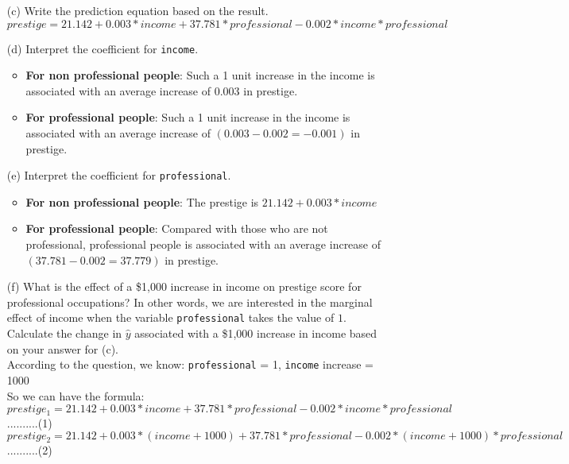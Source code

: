 \documentclass[12pt,letterpaper]{article}
\begin{document}
\begin{enumerate}
	\vspace{.5cm}

	\item [(c)]
	Write the prediction equation based on the result.\\
	
	$prestige = 21.142 + 0.003 * income + 37.781 * professional - 0.002 * income * professional$
	
	\vspace{.5cm}
	\item [(d)]
	Interpret the coefficient for \texttt{income}.
	\begin{itemize}
		\item \textbf{For non professional people}: Such a 1 unit increase in the income is associated with an average increase of 0.003 in prestige.
		\item \textbf{For professional people}: Such a 1 unit increase in the income is associated with an average increase of $(0.003 - 0.002 = -0.001)$ in prestige.
	\end{itemize}
	\vspace{.5cm}
	\item [(e)]
	Interpret the coefficient for \texttt{professional}.
	\begin{itemize}
		\item  \textbf{For non professional people}: The prestige is $21.142 + 0.003 * income$
		\item \textbf{For professional people}: Compared with those who are not professional, professional people is associated with an average increase of $(37.781 - 0.002 = 37.779)$ in prestige.
	\end{itemize}
	\newpage
	\item [(f)]
	What is the effect of a \$1,000 increase in income on prestige score for professional occupations? In other words, we are interested in the marginal effect of income when the variable \texttt{professional} takes the value of $1$. Calculate the change in $\hat{y}$ associated with a \$1,000 increase in income based on your answer for (c).\\

	According to the question, we know: \texttt{professional} = 1,  \texttt{income} increase = 1000\\
	So we can have the formula: \\
	$prestige_1 =  21.142 + 0.003 * income + 37.781 * professional - 0.002 * income * professional $  ..........(1)\\
	$prestige_2 =  21.142 + 0.003 * (income + 1000) + 37.781 * professional - 0.002 * (income + 1000) * professional $ ..........(2) \\
	

\end{enumerate}
\end{document}
